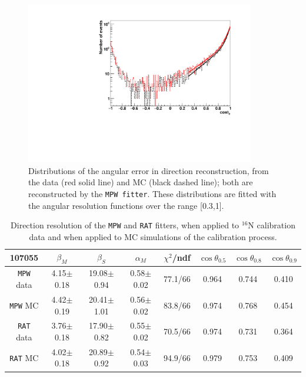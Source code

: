 \begin{figure}
	\centering
	\includegraphics[width=10cm]{16NangularResol.pdf}
	\caption[Distributions of the angular error in direction reconstruction, from the data and from MC.]{Distributions of the angular error in direction reconstruction, from the data (red solid line) and MC (black dashed line); both are reconstructed by the \texttt{MPW fitter}. These distributions are fitted with the angular resolution functions over the range [0.3,1].\label{angularResolMPW}}
\end{figure}

\begin{table}[ht]
	\caption[Direction resolution of the \texttt{MPW} and \texttt{RAT} fitters.]{Direction resolution of the \texttt{MPW} and \texttt{RAT} fitters, when applied to $^{16}$N calibration data and when applied to MC simulations of the calibration process.\label{tab:angularResolValuesUpdated}}
	\vspace{2.5mm}
	\begin{tabular}{cccccccc}%
		\toprule
	107055& $\beta_M$ &  $\beta_S$ & $\alpha_M$ & $\chi^2$/ndf & $\cos\theta_{0.5}$ & $\cos\theta_{0.8}$& $\cos\theta_{0.9}$\\
	\hline
	\texttt{MPW} data & 4.15$\pm$0.18 & 19.08$\pm$0.94 & 0.58$\pm$0.02 & 77.1/66 & 0.964 & 0.744 & 0.410 \\
	\texttt{MPW} MC & 4.42$\pm$0.19 & 20.41$\pm$1.01 & 0.56$\pm$0.02 & 83.8/66 & 0.974 & 0.768 & 0.454	 \\	
\hline
	\texttt{RAT} data & 3.76$\pm$0.18 & 17.90$\pm$0.82 & 0.55$\pm$0.02 & 70.5/66 & 0.974 & 0.731 & 0.364 \\
	\texttt{RAT} MC & 4.02$\pm$0.18 & 20.89$\pm$0.92 & 0.54$\pm$0.03 & 94.9/66 & 0.979 & 0.753 & 0.409	\\
		\bottomrule
	\end{tabular}
\end{table}

